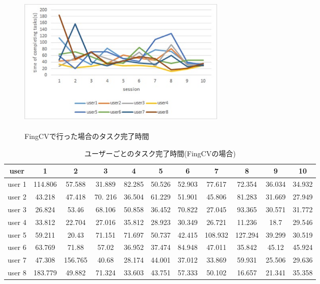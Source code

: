 \documentclass[11pt,a4j, titlepage]{jarticle} %
\begin{document}
\begin{figure}[H]
	\centering
	\includegraphics[width=10cm,height=7cm]{fingcvgraph.eps}
	\caption{FingCVで行った場合のタスク完了時間}
	\label{fig:f25}
\end{figure}

\begin{table}[H]
	\begin{center}
	\begin{tabular}{|c|c|c|c|c|c|c|c|c|c|c|} \hline
		user & 1 & 2 & 3 & 4 & 5 & 6 & 7 & 8 & 9 & 10\\ \hline \hline
		user 1 & 114.806 & 57.588 & 31.889 & 82.285 & 50.526 & 52.903 & 77.617 & 72.354 & 36.034 & 34.932\\
		user 2 &  43.218 & 47.418 & 70. 216 & 36.504 &61.229 & 51.901 & 45.806 & 81.283 & 31.669 & 27.949 \\
		user 3 &  26.824 & 53.46 & 68.106 & 50.858 & 36.452 & 70.822 & 27.045 & 93.365 & 30.571 & 31.772 \\
		user 4 &  33.812 & 22.704 & 27.016 & 35.812 & 28.923 & 30.349 &  26.721 & 11.236 & 18.7 & 29.546 \\
		user 5 &  59.211 & 20.43 & 71.151 & 71.697 & 50.737 & 42.415 & 108.932 & 127.294 & 39.299 & 30.519\\
		user 6 &  63.769 & 71.88 & 57.02 & 36.952 & 37.474 & 84.948 & 47.011 & 35.842 & 45.12 & 45.924\\
		user 7 &  47.308 & 156.765 & 40.68 & 28.174 & 44.001 & 37.012 & 33.869 & 59.931 & 25.506 & 29.636 \\
		user 8 &  183.779 & 49.882 & 71.324 & 33.603 & 43.751 & 57.333 & 50.102 & 16.657 & 21.341 & 35.358\\ \hline
	\end{tabular}
	\caption{ユーザーごとのタスク完了時間(FingCVの場合)}
	\label{table9}
	\end{center}
\end{table}
\end{document}
